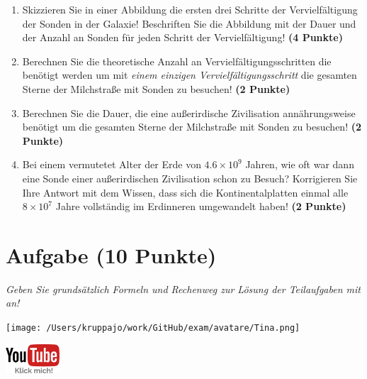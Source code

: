 \documentclass[a4paper, 9pt]{scrartcl}\usepackage[]{graphicx}\usepackage[]{xcolor}
\begin{document}
\begin{enumerate}
\item Skizzieren Sie in einer Abbildung die ersten drei Schritte der Vervielfältigung der Sonden in der Galaxie! Beschriften Sie die Abbildung mit der Dauer und der Anzahl an Sonden für jeden Schritt der Vervielfältigung! \textbf{(4 Punkte)}
\item Berechnen Sie die theoretische Anzahl an Vervielfältigungsschritten die benötigt werden um mit \textit{einem einzigen Vervielfältigungsschritt} die gesamten Sterne der Milchstraße mit Sonden zu besuchen! \textbf{(2 Punkte)}
\item Berechnen Sie die Dauer, die eine außerirdische Zivilisation annährungsweise benötigt um die gesamten Sterne der Milchstraße mit Sonden zu besuchen! \textbf{(2 Punkte)}
\item Bei einem vermutetet Alter der Erde von $\ensuremath{4.6\times 10^{9}}$ Jahren, wie oft war dann eine Sonde einer außerirdischen Zivilisation schon zu Besuch? Korrigieren Sie Ihre Antwort mit dem Wissen, dass sich die Kontinentalplatten einmal alle $\ensuremath{8\times 10^{7}}$ Jahre vollständig im Erdinneren umgewandelt haben! \textbf{(2 Punkte)}
\end{enumerate}


 
\clearpage

\section{Aufgabe \hfill (10 Punkte)}

\textit{Geben Sie grundsätzlich Formeln und Rechenweg zur Lösung der Teilaufgaben mit an!} \\[1Ex]
 

 
\begin{minipage}[t]{0.5\textwidth}
\texttt{[image: /Users/kruppajo/work/GitHub/exam/avatare/Tina.png]}
\end{minipage}
\begin{minipage}[t]{0.5\textwidth}
\hfill
\href{https://youtu.be/tDgr6fpkkYA}{\includegraphics[width = 2cm]{img/youtube}}
\end{minipage}
\end{document}
